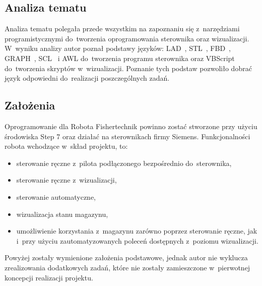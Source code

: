 \subsection{Analiza tematu}
Analiza tematu polegała przede wszystkim na zapoznaniu się z~narzędziami programistycznymi do~tworzenia oprogramowania sterownika oraz wizualizacji.
W~wyniku analizy autor poznał podstawy języków: LAD~\cite{step1,step2,step3}, STL~\cite{step1,step2,step3}, FBD~\cite{step1,step2,step3}, GRAPH~\cite{step3}, SCL~\cite{scl1,scl2,scl3} i AWL do~tworzenia programu sterownika oraz VBScript do~tworzenia skryptów w~wizualizacji. Poznanie tych podstaw pozwoliło dobrać język odpowiedni do~realizacji poszczególnych zadań.

\subsection{Założenia}
Oprogramowanie dla Robota Fishertechnik powinno zostać stworzone przy użyciu środowiska Step 7 oraz działać na sterownikach firmy Siemens. Funkcjonalności robota wchodzące w~skład projektu, to:
\begin{itemize}
\item sterowanie ręczne z~pilota podłączonego bezpośrednio do~sterownika,
\item sterowanie ręczne z~wizualizacji,
\item sterowanie automatyczne, 
\item wizualizacja stanu magazynu,
\item umożliwienie korzystania z~magazynu zarówno poprzez sterowanie ręczne, jak i~przy użyciu zautomatyzowanych poleceń dostępnych z~poziomu wizualizacji.
\end{itemize}
\indent
\indent Powyżej zostały wymienione założenia podstawowe, jednak autor nie wyklucza zrealizowania dodatkowych zadań, które nie zostały zamieszczone w~pierwotnej koncepcji realizacji projektu.

